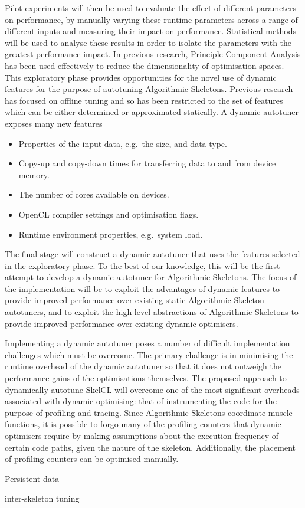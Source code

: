 Pilot experiments will then be used to evaluate the effect of
different parameters on performance, by manually varying these runtime
parameters across a range of different inputs and measuring their
impact on performance. Statistical methods will be used to analyse
these results in order to isolate the parameters with the greatest
performance impact. In previous research, Principle Component Analysis
has been used effectively to reduce the dimensionality of optimisation
spaces. This exploratory phase provides opportunities for the novel
use of dynamic features for the purpose of autotuning Algorithmic
Skeletons. Previous research has focused on offline tuning and so has
been restricted to the set of features which can be either determined
or approximated statically. A dynamic autotuner exposes many new
features

\begin{itemize}
\item Properties of the input data, e.g.\ the size, and data type.
\item Copy-up and copy-down times for transferring data to and from
  device memory.
\item The number of cores available on devices.
\item OpenCL compiler settings and optimisation flags.
\item Runtime environment properties, e.g.\ system load.
\end{itemize}

The final stage will construct a dynamic autotuner that uses the
features selected in the exploratory phase. To the best of our
knowledge, this will be the first attempt to develop a dynamic
autotuner for Algorithmic Skeletons. The focus of the implementation
will be to exploit the advantages of dynamic features to provide
improved performance over existing static Algorithmic Skeleton
autotuners, and to exploit the high-level abstractions of Algorithmic
Skeletons to provide improved performance over existing dynamic
optimisers.

Implementing a dynamic autotuner poses a number of difficult
implementation challenges which must be overcome.
The primary challenge is in minimising the runtime overhead of the
dynamic autotuner so that it does not outweigh the performance gains
of the optimisations themselves. The proposed approach to dynamically
autotune SkelCL will overcome one of the most significant overheads
associated with dynamic optimising: that of instrumenting the code for
the purpose of profiling and tracing. Since Algorithmic Skeletons
coordinate muscle functions, it is possible to forgo many of the
profiling counters that dynamic optimisers require by making
assumptions about the execution frequency of certain code paths, given
the nature of the skeleton. Additionally, the placement of profiling
counters can be optimised manually.

Persistent data

inter-skeleton tuning

